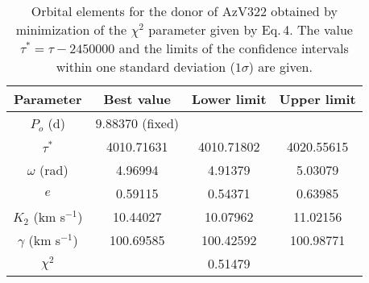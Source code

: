 \documentclass[useAMS,usenatbib]{mn2e}
\begin{document}

\begin{table}
    \centering
    \caption{Orbital elements for the donor of AzV322 obtained by minimization of the $\chi^2$ parameter given by Eq.\,4. The value $\tau^*=\tau-2450000$ and the limits of the confidence intervals within one standard deviation ($1\sigma$) are given.}
    \label{tab:pikresult}
    \begin{tabular}{cccc} 
        \hline
        Parameter&Best value&Lower limit&Upper limit\\
        \hline
        $P_o$ (d)   & $9.88370$ (fixed)&  &  \\
        $\tau^{*}$    &4010.71631&4010.71802&4020.55615\\
        $\omega$ (rad)&4.96994&4.91379&5.03079\\
        $e$    &0.59115&0.54371&0.63985\\
        $K_2$ (km s$^{-1}$)&10.44027&10.07962&11.02156\\
        $\gamma$ (km s$^{-1}$)&100.69585&100.42592&100.98771\\
        \hline
        $\chi^2$&&0.51479&\\
        \hline
    \end{tabular}
\end{table}
\end{document}
